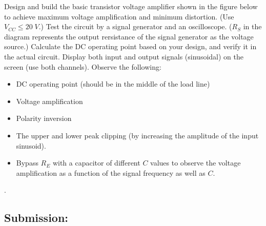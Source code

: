 Design and build the basic transistor voltage amplifier shown in the figure
below to achieve maximum voltage amplification and minimum distortion. (Use
$V_{CC}\le 20\;V$.) Test the circuit by a signal generator and an oscilloscope.
($R_S$ in the diagram represents the output rersistance of the signal generator 
as the voltage source.) Calculate the DC operating point based on your design,
and verify it in the actual circuit. Display both input and output signals
(sinusoidal) on the screen (use both channels). Observe the following:
\begin{itemize}
\item DC operating point (should be in the middle of the load line)
\item Voltage amplification
\item Polarity inversion
\item The upper and lower peak clipping (by increasing the amplitude of 
  the input sinusoid).
\item Bypass $R_E$ with a capacitor of different $C$ values to observe the voltage amplification as a function of the signal frequency as well as $C$.
\end{itemize}

.

\subsection{Submission:}

